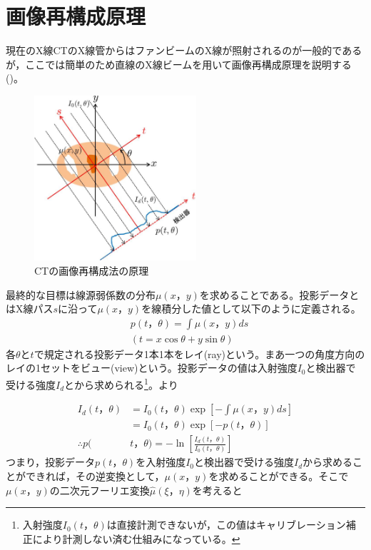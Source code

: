 \section{画像再構成原理}
現在のX線CTのX線管からはファンビームのX線が照射されるのが一般的であるが，ここでは簡単のため直線のX線ビームを用いて画像再構成原理を説明する()。

\begin{figure}
 \begin{center}
 \includegraphics[width=6cm]{image/other/FBP.eps}
 \end{center}
 \caption{CTの画像再構成法の原理}
 \label{fig:FBP}
\end{figure}

最終的な目標は線源弱係数の分布$\mu(x，y)$を求めることである。投影データとはX線パス$s$に沿って$\mu(x，y)$を線積分した値として以下のように定義される。
\begin{align}
&p(t，\theta)=\int\mu(x，y)ds\\
&(t=x\cos{\theta}+y\sin{\theta})
\end{align}
各$\theta$と$t$で規定される投影データ1本1本をレイ(ray)という。まあ一つの角度方向のレイの1セットをビュー(view)という。投影データの値は入射強度$I_0$と検出器で受ける強度$I_d$とから求められる\footnote{入射強度$I_0(t，\theta)$は直接計測できないが，この値はキャリブレーション補正により計測しない済む仕組みになっている。}。より

\begin{align}
I_d(t，\theta)&=I_0(t，\theta)\exp{\left[-\int\mu(x，y)ds\right]}\\
&=I_0(t，\theta)\exp[-p(t，\theta)]\\
∴p(&t，\theta)=-\ln\left[\frac{I_d(t，\theta)}{I_0(t，\theta)}\right]\label{eq:touei}
\end{align}
つまり，投影データ$p(t，\theta)$を入射強度$I_0$と検出器で受ける強度$I_d$から求めることができれば，その逆変換として，$\mu(x，y)$を求めることができる。そこで$\mu(x，y)$の二次元フーリエ変換$\hat{\mu}(\xi，\eta)$を考えると

